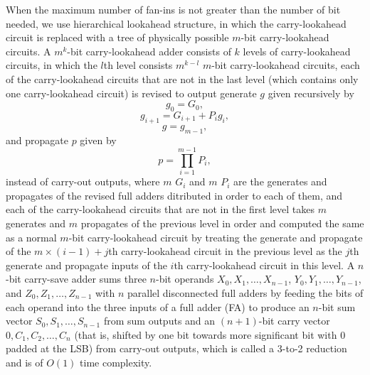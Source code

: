 \documentclass[a4paper,12pt]{report}
\begin{document}
When the maximum number of fan-ins is not greater than the number of bit needed, we use hierarchical lookahead structure, in which the carry-lookahead circuit is replaced with a tree of physically possible $m$-bit carry-lookahead circuits. A $m^k$-bit carry-lookahead adder consists of $k$ levels of carry-lookahead circuits, in which the $l$th level consists $m^{k-l}$ $m$-bit carry-lookahead circuits, each of the carry-lookahead circuits that are not in the last level (which contains only one
carry-lookahead circuit) is revised to output generate $g$ given recursively by
\[g_0=G_0,\]
\[g_{i+1}=G_{i+1}+P_ig_i,\]
\[g=g_{m-1},\]
and propagate $p$ given by
\[p=\prod_{i=1}^{m-1}P_i,\]
instead of carry-out outputs, where $m$ $G_i$ and $m$ $P_i$ are the generates and propagates of the revised full adders ditributed in order to each of them, and each of the carry-lookahead circuits that are not in the first level takes $m$ generates and $m$ propagates of the previous level in order and computed the same as a normal $m$-bit carry-lookahead circuit by treating the generate and propagate of the $m\times(i-1)+j$th carry-lookahead circuit in the previous level as the $j$th generate and propagate inputs of the $i$th carry-lookahead circuit in this level.
A $n$-bit carry-save adder sums three $n$-bit operands $X_0,X_1,\ldots,X_{n-1}$, $Y_0,Y_1,\ldots,Y_{n-1}$, and $Z_0,Z_1,\ldots,Z_{n-1}$ with $n$ parallel disconnected full adders by feeding the bits of each operand into the three inputs of a full adder (FA) to produce an $n$-bit sum vector $S_0,S_1,\ldots,S_{n-1}$ from sum outputs and an $(n+1)$-bit carry vector $0,C_1,C_2,\ldots,C_n$ (that is, shifted by one bit towards more significant bit with 0 padded at the LSB) from carry-out outputs, which is called a 3-to-2 reduction and is of $O(1)$ time complexity.
\end{document}
